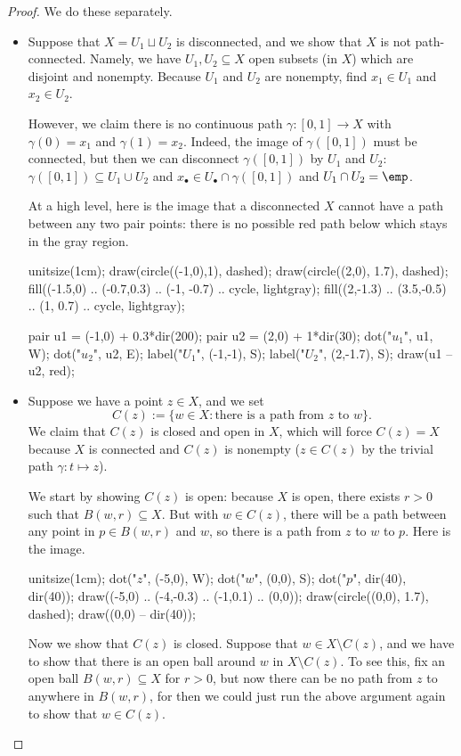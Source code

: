 \begin{proof}
	We do these separately.
	\begin{itemize}
		\item Suppose that $X=U_1\sqcup U_2$ is disconnected, and we show that $X$ is not path-connected. Namely, we have $U_1,U_2\subseteq X$ open subsets (in $X$) which are disjoint and nonempty. Because $U_1$ and $U_2$ are nonempty, find $x_1\in U_1$ and $x_2\in U_2$.

		However, we claim there is no continuous path $\gamma:[0,1]\to X$ with $\gamma(0)=x_1$ and $\gamma(1)=x_2$. Indeed, the image of $\gamma([0,1])$ must be connected, but then we can disconnect $\gamma([0,1])$ by $U_1$ and $U_2$: $\gamma([0,1])\subseteq U_1\cup U_2$ and $x_\bullet\in U_\bullet\cap\gamma([0,1])$ and $U_1\cap U_2=\emp$.

		At a high level, here is the image that a disconnected $X$ cannot have a path between any two pair points: there is no possible red path below which stays in the gray region.
		\begin{center}
			\begin{asy}
				unitsize(1cm);
				draw(circle((-1,0),1), dashed);
				draw(circle((2,0), 1.7), dashed);
				fill((-1.5,0) .. (-0.7,0.3) .. (-1, -0.7) .. cycle, lightgray);
				fill((2,-1.3) .. (3.5,-0.5) .. (1, 0.7) .. cycle, lightgray);

				pair u1 = (-1,0) + 0.3*dir(200);
				pair u2 = (2,0) + 1*dir(30);
				dot("$u_1$", u1, W);
				dot("$u_2$", u2, E);
				label("$U_1$", (-1,-1), S);
				label("$U_2$", (2,-1.7), S);
				draw(u1 -- u2, red);
			\end{asy}
		\end{center}

		\item Suppose we have a point $z\in X$, and we set
		\[C(z):=\{w\in X:\text{there is a path from }z\text{ to }w\}.\]
		We claim that $C(z)$ is closed and open in $X$, which will force $C(z)=X$ because $X$ is connected and $C(z)$ is nonempty ($z\in C(z)$ by the trivial path $\gamma:t\mapsto z$).

		We start by showing $C(z)$ is open: because $X$ is open, there exists $r>0$ such that $B(w,r)\subseteq X$. But with $w\in C(z)$, there will be a path between any point in $p\in B(w,r)$ and $w$, so there is a path from $z$ to $w$ to $p$. Here is the image.
		\begin{center}
			\begin{asy}
				unitsize(1cm);
				dot("$z$", (-5,0), W);
				dot("$w$", (0,0), S);
				dot("$p$", dir(40), dir(40));
				draw((-5,0) .. (-4,-0.3) .. (-1,0.1) .. (0,0));
				draw(circle((0,0), 1.7), dashed);
				draw((0,0) -- dir(40));
			\end{asy}
		\end{center}

		Now we show that $C(z)$ is closed. Suppose that $w\in X\setminus C(z)$, and we have to show that there is an open ball around $w$ in $X\setminus C(z)$. To see this, fix an open ball $B(w,r)\subseteq X$ for $r>0$, but now there can be no path from $z$ to anywhere in $B(w,r)$, for then we could just run the above argument again to show that $w\in C(z)$.
		\qedhere
	\end{itemize}
\end{proof}
